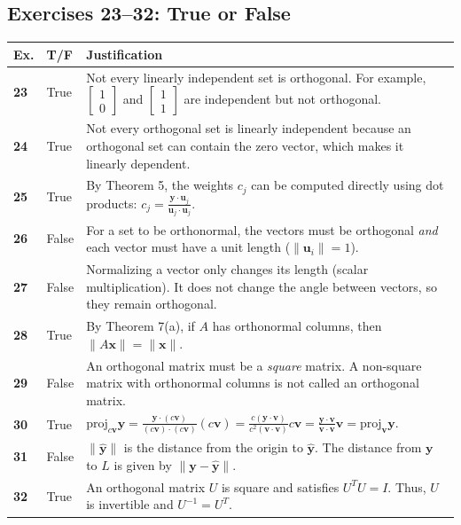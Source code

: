 \documentclass[11pt, letterpaper]{article}
\theoremstyle{definition}
\theoremstyle{remark}
\begin{document}
\subsection{Exercises 23--32: True or False}
\renewcommand{\arraystretch}{1.5}
\begin{tabularx}{\textwidth}{>{\hsize=0.1\hsize}X >{\hsize=0.15\hsize}X >{\hsize=0.75\hsize}X}
\toprule
\textbf{Ex.} & \textbf{T/F} & \textbf{Justification} \\
\midrule
\textbf{23} & True & Not every linearly independent set is orthogonal. For example, $\begin{bmatrix} 1 \\ 0 \end{bmatrix}$ and $\begin{bmatrix} 1 \\ 1 \end{bmatrix}$ are independent but not orthogonal. \\
\textbf{24} & True & Not every orthogonal set is linearly independent because an orthogonal set can contain the zero vector, which makes it linearly dependent. \\
\textbf{25} & True & By Theorem 5, the weights $c_j$ can be computed directly using dot products: $c_j = \frac{\mathbf{y} \cdot \mathbf{u}_j}{\mathbf{u}_j \cdot \mathbf{u}_j}$. \\
\textbf{26} & False & For a set to be orthonormal, the vectors must be orthogonal \textit{and} each vector must have a unit length ($\|\mathbf{u}_i\| = 1$). \\
\textbf{27} & False & Normalizing a vector only changes its length (scalar multiplication). It does not change the angle between vectors, so they remain orthogonal. \\
\textbf{28} & True & By Theorem 7(a), if $A$ has orthonormal columns, then $\|A\mathbf{x}\| = \|\mathbf{x}\|$. \\
\textbf{29} & False & An orthogonal matrix must be a \textit{square} matrix. A non-square matrix with orthonormal columns is not called an orthogonal matrix. \\
\textbf{30} & True & $\text{proj}_{c\mathbf{v}} \mathbf{y} = \frac{\mathbf{y} \cdot (c\mathbf{v})}{(c\mathbf{v}) \cdot (c\mathbf{v})} (c\mathbf{v}) = \frac{c(\mathbf{y} \cdot \mathbf{v})}{c^2(\mathbf{v} \cdot \mathbf{v})} c\mathbf{v} = \frac{\mathbf{y} \cdot \mathbf{v}}{\mathbf{v} \cdot \mathbf{v}} \mathbf{v} = \text{proj}_{\mathbf{v}} \mathbf{y}$. \\
\textbf{31} & False & $\|\hat{\mathbf{y}}\|$ is the distance from the origin to $\hat{\mathbf{y}}$. The distance from $\mathbf{y}$ to $L$ is given by $\|\mathbf{y} - \hat{\mathbf{y}}\|$. \\
\textbf{32} & True & An orthogonal matrix $U$ is square and satisfies $U^T U = I$. Thus, $U$ is invertible and $U^{-1} = U^T$. \\
\bottomrule
\end{tabularx}
\end{document}
